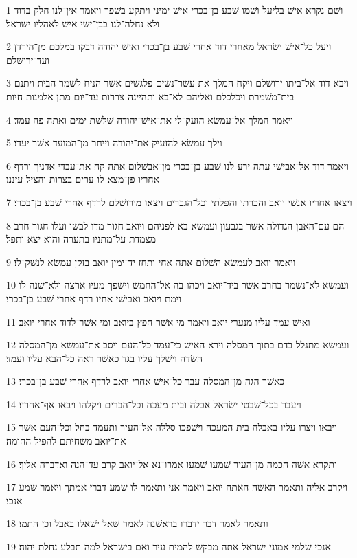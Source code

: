 \par 1 ושׁם נקרא אישׁ בליעל ושׁמו שׁבע בן־בכרי אישׁ ימיני ויתקע בשׁפר ויאמר אין־לנו חלק בדוד ולא נחלה־לנו בבן־ישׁי אישׁ לאהליו ישׂראל׃
\par 2 ויעל כל־אישׁ ישׂראל מאחרי דוד אחרי שׁבע בן־בכרי ואישׁ יהודה דבקו במלכם מן־הירדן ועד־ירושׁלם׃
\par 3 ויבא דוד אל־ביתו ירושׁלם ויקח המלך את עשׂר־נשׁים פלגשׁים אשׁר הניח לשׁמר הבית ויתנם בית־משׁמרת ויכלכלם ואליהם לא־בא ותהיינה צררות עד־יום מתן אלמנות חיות׃
\par 4 ויאמר המלך אל־עמשׂא הזעק־לי את־אישׁ־יהודה שׁלשׁת ימים ואתה פה עמד׃
\par 5 וילך עמשׂא להזעיק את־יהודה וייחר מן־המועד אשׁר יעדו׃
\par 6 ויאמר דוד אל־אבישׁי עתה ירע לנו שׁבע בן־בכרי מן־אבשׁלום אתה קח את־עבדי אדניך ורדף אחריו פן־מצא לו ערים בצרות והציל עיננו׃
\par 7 ויצאו אחריו אנשׁי יואב והכרתי והפלתי וכל־הגברים ויצאו מירושׁלם לרדף אחרי שׁבע בן־בכרי׃
\par 8 הם עם־האבן הגדולה אשׁר בגבעון ועמשׂא בא לפניהם ויואב חגור מדו לבשׁו ועלו חגור חרב מצמדת על־מתניו בתערה והוא יצא ותפל׃
\par 9 ויאמר יואב לעמשׂא השׁלום אתה אחי ותחז יד־ימין יואב בזקן עמשׂא לנשׁק־לו׃
\par 10 ועמשׂא לא־נשׁמר בחרב אשׁר ביד־יואב ויכהו בה אל־החמשׁ וישׁפך מעיו ארצה ולא־שׁנה לו וימת ויואב ואבישׁי אחיו רדף אחרי שׁבע בן־בכרי׃
\par 11 ואישׁ עמד עליו מנערי יואב ויאמר מי אשׁר חפץ ביואב ומי אשׁר־לדוד אחרי יואב׃
\par 12 ועמשׂא מתגלל בדם בתוך המסלה וירא האישׁ כי־עמד כל־העם ויסב את־עמשׂא מן־המסלה השׂדה וישׁלך עליו בגד כאשׁר ראה כל־הבא עליו ועמד׃
\par 13 כאשׁר הגה מן־המסלה עבר כל־אישׁ אחרי יואב לרדף אחרי שׁבע בן־בכרי׃
\par 14 ויעבר בכל־שׁבטי ישׂראל אבלה ובית מעכה וכל־הברים ויקלהו ויבאו אף־אחריו׃
\par 15 ויבאו ויצרו עליו באבלה בית המעכה וישׁפכו סללה אל־העיר ותעמד בחל וכל־העם אשׁר את־יואב משׁחיתם להפיל החומה׃
\par 16 ותקרא אשׁה חכמה מן־העיר שׁמעו שׁמעו אמרו־נא אל־יואב קרב עד־הנה ואדברה אליך׃
\par 17 ויקרב אליה ותאמר האשׁה האתה יואב ויאמר אני ותאמר לו שׁמע דברי אמתך ויאמר שׁמע אנכי׃
\par 18 ותאמר לאמר דבר ידברו בראשׁנה לאמר שׁאל ישׁאלו באבל וכן התמו׃
\par 19 אנכי שׁלמי אמוני ישׂראל אתה מבקשׁ להמית עיר ואם בישׂראל למה תבלע נחלת יהוה׃
